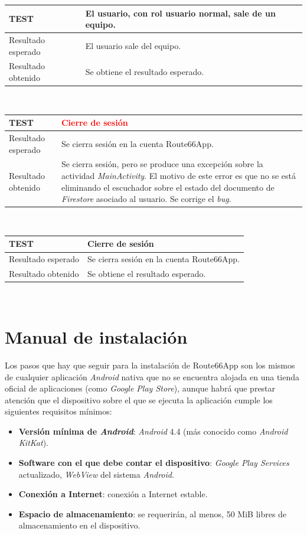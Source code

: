 \documentclass[twoside]{report}
\newcommand\addrow[2]{#1 &#2\\ }
\newcommand\addheading[2]{#1 &#2\\ \hline}
\newcommand\tabularhead{\begin{tabular}{lp{0.7\textwidth}}
\hline
}
\newenvironment{test}{\tabularhead}
{\hline\end{tabular}}
\begin{document}
\begin{test}
 \addheading{\textbf{TEST\arabic{test}}}{El usuario, con rol usuario normal, sale de un equipo.}
 \addrow{Resultado esperado}{El usuario sale del equipo.}
 \addrow{Resultado obtenido}{Se obtiene el resultado esperado.}
\end{test}\\

\vspace{0.5cm}

\begin{test}
 \addheading{\textbf{TEST\arabic{test}}}{\textcolor{red}{Cierre de sesión}}
 \addrow{Resultado esperado}{Se cierra sesión en la cuenta Route66App.}
 \addrow{Resultado obtenido}{Se cierra sesión, pero se produce una excepción sobre la actividad 			\textit{MainActivity}. El motivo de este error es que no se está eliminando el escuchador sobre el estado del documento de \textit{Firestore} asociado al usuario. Se corrige el \textit{bug}.}
\end{test}\\

\vspace{0.5cm}

\begin{test}
 \addheading{\textbf{TEST\arabic{test}}}{Cierre de sesión}
 \addrow{Resultado esperado}{Se cierra sesión en la cuenta Route66App.}
 \addrow{Resultado obtenido }{Se obtiene el resultado esperado.}
\end{test}\\

\section{Manual de instalación}

Los pasos que hay que seguir para la instalación de Route66App son los mismos de cualquier aplicación \textit{Android} nativa que no se encuentra alojada en una tienda oficial de aplicaciones (como \textit{Google Play Store}), aunque habrá que prestar atención que el dispositivo sobre el que se ejecuta la aplicación cumple los siguientes requisitos mínimos:

\begin{itemize}
	\item \textbf{Versión mínima de \textit{Android}}: \textit{Android} 4.4 (más conocido como \textit{Android KitKat}).
	\item \textbf{Software con el que debe contar el dispositivo}: \textit{Google Play Services} actualizado, \textit{WebView} del sistema \textit{Android}.
	\item \textbf{Conexión a Internet}: conexión a Internet estable.
	\item \textbf{Espacio de almacenamiento}: se requerirán, al menos, 50 MiB libres de almacenamiento en el dispositivo.
\end{itemize}
\end{document}
